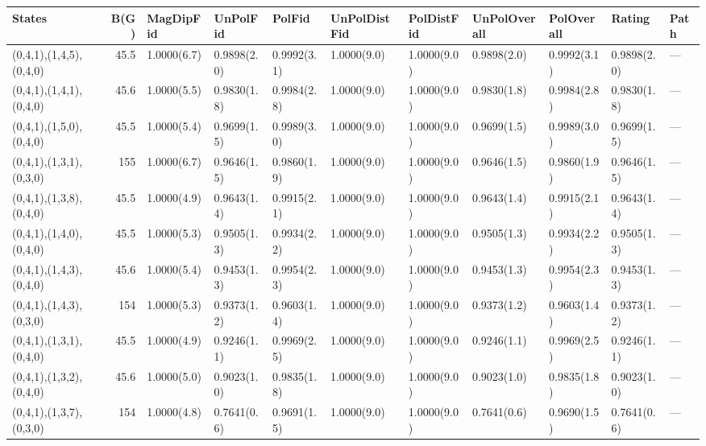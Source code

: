 \begin{tabular}{lrlllllllll}
\hline
 States                     &   B(G) & MagDipFid    & UnPolFid     & PolFid       & UnPolDistFid   & PolDistFid   & UnPolOverall   & PolOverall   & Rating       & Path   \\
\hline
 (0,4,1),(1,4,5),(0,4,0)    &   45.5 & 1.0000(6.7)  & 0.9898(2.0)  & 0.9992(3.1)  & 1.0000(9.0)    & 1.0000(9.0)  & 0.9898(2.0)    & 0.9992(3.1)  & 0.9898(2.0)  & ---    \\
 (0,4,1),(1,4,1),(0,4,0)    &   45.6 & 1.0000(5.5)  & 0.9830(1.8)  & 0.9984(2.8)  & 1.0000(9.0)    & 1.0000(9.0)  & 0.9830(1.8)    & 0.9984(2.8)  & 0.9830(1.8)  & ---    \\
 (0,4,1),(1,5,0),(0,4,0)    &   45.5 & 1.0000(5.4)  & 0.9699(1.5)  & 0.9989(3.0)  & 1.0000(9.0)    & 1.0000(9.0)  & 0.9699(1.5)    & 0.9989(3.0)  & 0.9699(1.5)  & ---    \\
 (0,4,1),(1,3,1),(0,3,0)    &  155   & 1.0000(6.7)  & 0.9646(1.5)  & 0.9860(1.9)  & 1.0000(9.0)    & 1.0000(9.0)  & 0.9646(1.5)    & 0.9860(1.9)  & 0.9646(1.5)  & ---    \\
 (0,4,1),(1,3,8),(0,4,0)    &   45.5 & 1.0000(4.9)  & 0.9643(1.4)  & 0.9915(2.1)  & 1.0000(9.0)    & 1.0000(9.0)  & 0.9643(1.4)    & 0.9915(2.1)  & 0.9643(1.4)  & ---    \\
 (0,4,1),(1,4,0),(0,4,0)    &   45.5 & 1.0000(5.3)  & 0.9505(1.3)  & 0.9934(2.2)  & 1.0000(9.0)    & 1.0000(9.0)  & 0.9505(1.3)    & 0.9934(2.2)  & 0.9505(1.3)  & ---    \\
 (0,4,1),(1,4,3),(0,4,0)    &   45.6 & 1.0000(5.4)  & 0.9453(1.3)  & 0.9954(2.3)  & 1.0000(9.0)    & 1.0000(9.0)  & 0.9453(1.3)    & 0.9954(2.3)  & 0.9453(1.3)  & ---    \\
 (0,4,1),(1,4,3),(0,3,0)    &  154   & 1.0000(5.3)  & 0.9373(1.2)  & 0.9603(1.4)  & 1.0000(9.0)    & 1.0000(9.0)  & 0.9373(1.2)    & 0.9603(1.4)  & 0.9373(1.2)  & ---    \\
 (0,4,1),(1,3,1),(0,4,0)    &   45.5 & 1.0000(4.9)  & 0.9246(1.1)  & 0.9969(2.5)  & 1.0000(9.0)    & 1.0000(9.0)  & 0.9246(1.1)    & 0.9969(2.5)  & 0.9246(1.1)  & ---    \\
 (0,4,1),(1,3,2),(0,4,0)    &   45.6 & 1.0000(5.0)  & 0.9023(1.0)  & 0.9835(1.8)  & 1.0000(9.0)    & 1.0000(9.0)  & 0.9023(1.0)    & 0.9835(1.8)  & 0.9023(1.0)  & ---    \\
 (0,4,1),(1,3,7),(0,3,0)    &  154   & 1.0000(4.8)  & 0.7641(0.6)  & 0.9691(1.5)  & 1.0000(9.0)    & 1.0000(9.0)  & 0.7641(0.6)    & 0.9690(1.5)  & 0.7641(0.6)  & ---    \\

\end{tabular}
